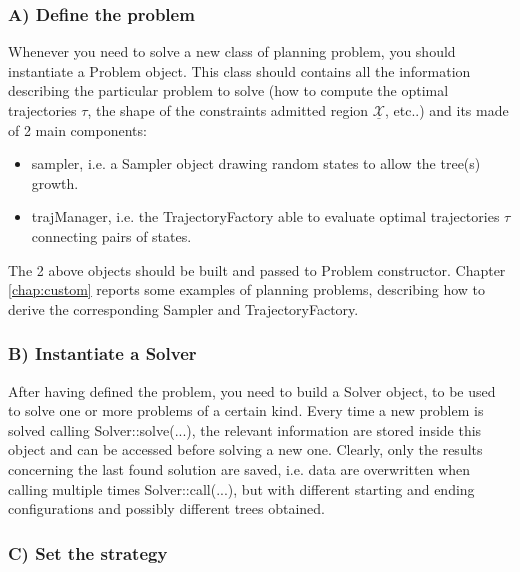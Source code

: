 \subsubsection{A) Define the problem}
\label{sec:define_problem}

Whenever you need to solve a new class of planning problem, you should instantiate a Problem object.
This class should contains all the information describing the particular problem to solve (how to compute the optimal trajectories $\tau$, the shape of the constraints admitted region $\underline{\mathcal{X}}$, etc..) and its made of 2 main components:
\begin{itemize}
\item sampler, i.e. a Sampler object drawing random states to allow the tree(s) growth.
\item trajManager, i.e. the TrajectoryFactory able to evaluate optimal trajectories $\tau$ connecting pairs of states.
\end{itemize}
The 2 above objects should be built and passed to Problem constructor. 
Chapter \ref{chap:custom} reports some examples of planning problems, describing how to derive the corresponding Sampler and TrajectoryFactory.

\subsubsection{B) Instantiate a Solver}

After having defined the problem, you need to build a Solver object, to be used to solve one or more problems of a certain kind.
Every time a new problem is solved calling Solver::solve(...), the relevant information are stored inside this object and can be accessed before solving a new one.
Clearly, only the results concerning the last found solution are saved, i.e. data are overwritten when calling multiple times Solver::call(...), but with different starting and ending configurations and possibly different trees obtained.

\subsubsection{C) Set the strategy}


